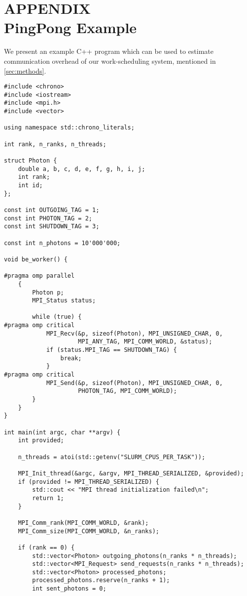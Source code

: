 \appendix
\chapter*{APPENDIX \\ PingPong Example}
\setcounter{chapter}{1}

\label{appendix:pingpong}
We present an example C++ program which can be used to estimate communication overhead of our work-scheduling system, mentioned in \ref{sec:methods}.

\begin{lstlisting}
#include <chrono>
#include <iostream>
#include <mpi.h>
#include <vector>

using namespace std::chrono_literals;

int rank, n_ranks, n_threads;

struct Photon {
    double a, b, c, d, e, f, g, h, i, j;
    int rank;
    int id;
};

const int OUTGOING_TAG = 1;
const int PHOTON_TAG = 2;
const int SHUTDOWN_TAG = 3;

const int n_photons = 10'000'000;

void be_worker() {

#pragma omp parallel
    {
        Photon p;
        MPI_Status status;

        while (true) {
#pragma omp critical
            MPI_Recv(&p, sizeof(Photon), MPI_UNSIGNED_CHAR, 0,
                     MPI_ANY_TAG, MPI_COMM_WORLD, &status);
            if (status.MPI_TAG == SHUTDOWN_TAG) {
                break;
            }
#pragma omp critical
            MPI_Send(&p, sizeof(Photon), MPI_UNSIGNED_CHAR, 0,
                     PHOTON_TAG, MPI_COMM_WORLD);
        }
    }
}

int main(int argc, char **argv) {
    int provided;

    n_threads = atoi(std::getenv("SLURM_CPUS_PER_TASK"));

    MPI_Init_thread(&argc, &argv, MPI_THREAD_SERIALIZED, &provided);
    if (provided != MPI_THREAD_SERIALIZED) {
        std::cout << "MPI thread initialization failed\n";
        return 1;
    }

    MPI_Comm_rank(MPI_COMM_WORLD, &rank);
    MPI_Comm_size(MPI_COMM_WORLD, &n_ranks);

    if (rank == 0) {
        std::vector<Photon> outgoing_photons(n_ranks * n_threads);
        std::vector<MPI_Request> send_requests(n_ranks * n_threads);
        std::vector<Photon> processed_photons;
        processed_photons.reserve(n_ranks + 1);
        int sent_photons = 0;


\end{lstlisting}
